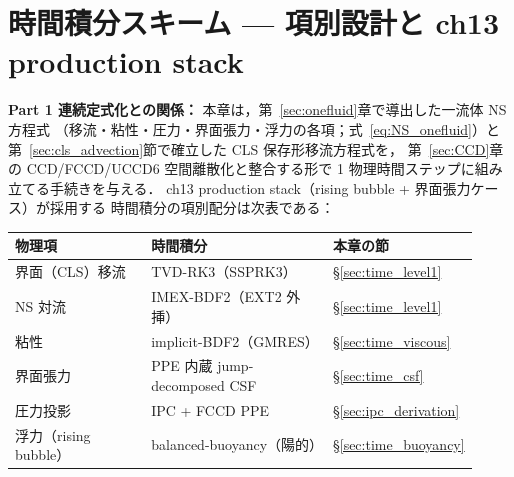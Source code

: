 %
\section{時間積分スキーム — 項別設計と ch13 production stack}
\label{ch:time_integration}
\label{sec:time_int}%

\noindent\textbf{Part 1 連続定式化との関係：}
本章は，第~\ref{sec:onefluid}章で導出した一流体 NS 方程式
（移流・粘性・圧力・界面張力・浮力の各項；式~\eqref{eq:NS_onefluid}）と
第~\ref{sec:cls_advection}節で確立した CLS 保存形移流方程式を，
第~\ref{sec:CCD}章の CCD/FCCD/UCCD6 空間離散化と整合する形で
1 物理時間ステップに組み立てる手続きを与える．
ch13 production stack（rising bubble + 界面張力ケース）が採用する
時間積分の項別配分は次表である：

\begin{tcolorbox}[colback=blue!3!white,colframe=blue!50!black,
                  title=\textbf{ch13 production stack：項別時間積分},
                  fonttitle=\small\bfseries,boxrule=0.4pt,arc=2pt]
\small
\renewcommand{\arraystretch}{1.15}
\begin{tabular}{@{}p{0.30\linewidth}p{0.40\linewidth}p{0.22\linewidth}@{}}
\hline
物理項 & 時間積分 & 本章の節 \\
\hline
界面（CLS）移流 & TVD-RK3（SSPRK3） & §\ref{sec:time_level1} \\
NS 対流 & IMEX-BDF2（EXT2 外挿） & §\ref{sec:time_level1} \\
粘性 & implicit-BDF2（GMRES） & §\ref{sec:time_viscous} \\
界面張力 & PPE 内蔵 jump-decomposed CSF & §\ref{sec:time_csf} \\
圧力投影 & IPC + FCCD PPE & §\ref{sec:ipc_derivation} \\
浮力（rising bubble） & balanced-buoyancy（陽的） & §\ref{sec:time_buoyancy} \\
\hline
\end{tabular}
\end{tcolorbox}

